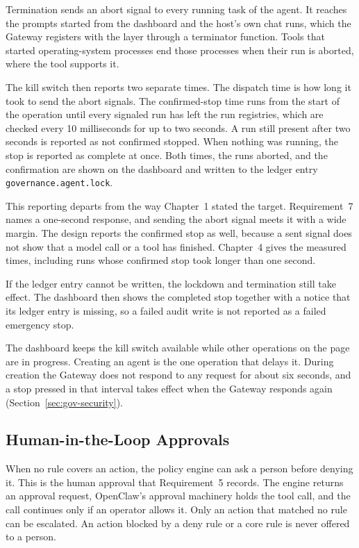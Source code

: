 Termination sends an abort signal to every running task of the agent. It
reaches the prompts started from the dashboard and the host's own chat
runs, which the Gateway registers with the layer through a terminator
function. Tools that started operating-system processes end those
processes when their run is aborted, where the tool supports it.

The kill switch then reports two separate times. The dispatch time is how
long it took to send the abort signals. The confirmed-stop time runs from
the start of the operation until every signaled run has left the run
registries, which are checked every 10 milliseconds for up to two seconds.
A run still present after two seconds is reported as not confirmed
stopped. When nothing was running, the stop is reported as complete at
once. Both times, the runs aborted, and the confirmation are shown on the
dashboard and written to the ledger entry \texttt{governance.agent.lock}.

This reporting departs from the way Chapter~1 stated the target.
Requirement~7 names a one-second response, and sending the abort signal
meets it with a wide margin. The design reports the confirmed stop as
well, because a sent signal does not show that a model call or a tool has
finished. Chapter~4 gives the measured times, including runs whose
confirmed stop took longer than one second.

If the ledger entry cannot be written, the lockdown and termination still
take effect. The dashboard then shows the completed stop together with a
notice that its ledger entry is missing, so a failed audit write is not
reported as a failed emergency stop.

The dashboard keeps the kill switch available while other operations on
the page are in progress. Creating an agent is the one operation that
delays it. During creation the Gateway does not respond to any request for
about six seconds, and a stop pressed in that interval takes effect when
the Gateway responds again (Section~\ref{sec:gov-security}).

\FloatBarrier
\subsection{Human-in-the-Loop Approvals}
\label{sec:gov-approvals}

When no rule covers an action, the policy engine can ask a person before
denying it. This is the human approval that Requirement~5 records. The
engine returns an approval request, OpenClaw's approval machinery holds the
tool call, and the call continues only if an operator allows it. Only an
action that matched no rule can be escalated. An action blocked by a deny
rule or a core rule is never offered to a person.

